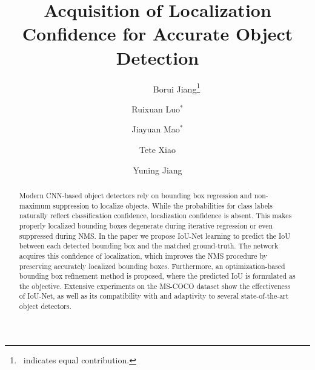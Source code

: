 \documentclass[runningheads]{llncs}
\begin{document}
\title{Acquisition of Localization Confidence for Accurate Object Detection}
\author{
  ~~~~~~~~~Borui Jiang\thanks{~indicates equal contribution.} \and
  Ruixuan Luo${}^*$ \and
  Jiayuan Mao${}^*$ \and \newline
  Tete Xiao \and
  Yuning Jiang
}

\maketitle
\begin{abstract}
Modern CNN-based object detectors rely on bounding box regression and non-maximum suppression to localize objects. While the probabilities for class labels naturally reflect classification confidence, localization confidence is absent. This makes properly localized bounding boxes degenerate during iterative regression or even suppressed during NMS. In the paper we propose IoU-Net learning to predict the IoU between each detected bounding box and the matched ground-truth. The network acquires this confidence of localization, which improves the NMS procedure by preserving accurately localized bounding boxes. Furthermore, an optimization-based bounding box refinement method is proposed, where the predicted IoU is formulated as the objective. Extensive experiments on the MS-COCO dataset show the effectiveness of IoU-Net, as well as its compatibility with and adaptivity to several state-of-the-art object detectors.
\end{abstract}
\end{document}
